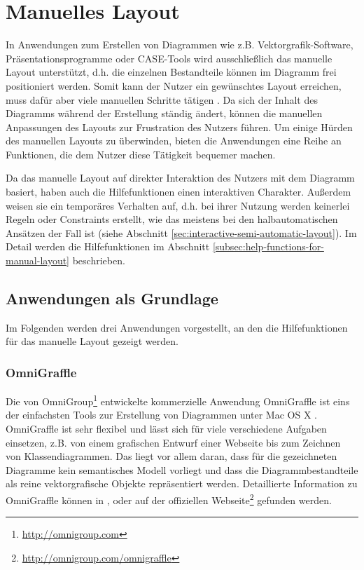 \section{Manuelles Layout}
\label{sec:manual-layout}

In Anwendungen zum Erstellen von Diagrammen wie z.B. Vektorgrafik-Software, Präsentationsprogramme oder CASE-Tools wird ausschließlich das manuelle Layout unterstützt, d.h. die einzelnen Bestandteile können im Diagramm frei positioniert werden. Somit kann der Nutzer ein gewünschtes Layout erreichen, muss dafür aber viele manuellen Schritte tätigen \cite{Eichelberger05Aesthetics}. Da sich der Inhalt des Diagramms während der Erstellung ständig ändert, können die manuellen Anpassungen des Layouts zur Frustration des Nutzers führen. Um einige Hürden des manuellen Layouts zu überwinden, bieten die Anwendungen eine Reihe an Funktionen, die dem Nutzer diese Tätigkeit bequemer machen.

Da das manuelle Layout auf direkter Interaktion des Nutzers mit dem Diagramm basiert, haben auch die Hilfefunktionen einen interaktiven Charakter. Außerdem weisen sie ein temporäres Verhalten auf, d.h. bei ihrer Nutzung werden keinerlei Regeln oder Constraints erstellt, wie das meistens bei den halbautomatischen Ansätzen der Fall ist (siehe Abschnitt \ref{sec:interactive-semi-automatic-layout}). Im Detail werden die Hilfefunktionen im Abschnitt \ref{subsec:help-functions-for-manual-layout} beschrieben.

\subsection{Anwendungen als Grundlage}
\label{subsec:applications-for-manual-layout}

Im Folgenden werden drei Anwendungen vorgestellt, an den die Hilfefunktionen für das manuelle Layout gezeigt werden.

\subsubsection{OmniGraffle}
\label{subsubsec:omnigraffle}

Die von OmniGroup\footnote{\url{http://omnigroup.com}} entwickelte kommerzielle Anwendung OmniGraffle ist eins der einfachsten Tools zur Erstellung von Diagrammen unter Mac OS X \cite{Olsen10OmniGraffle}. OmniGraffle ist sehr flexibel und lässt sich für viele verschiedene Aufgaben einsetzen, z.B. von einem grafischen Entwurf einer Webseite bis zum Zeichnen von Klassendiagrammen. Das liegt vor allem daran, dass für die gezeichneten Diagramme kein semantisches Modell vorliegt und dass die Diagrammbestandteile als reine vektorgrafische Objekte repräsentiert werden. Detaillierte Information zu OmniGraffle können in \cite{08OmniGraffle}, \cite{Olsen10OmniGraffle} oder auf der offiziellen Webseite\footnote{\url{http://omnigroup.com/omnigraffle}} gefunden werden.

